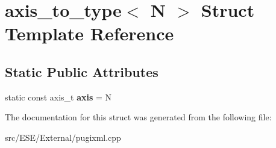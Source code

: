 \hypertarget{structaxis__to__type}{\section{axis\-\_\-to\-\_\-type$<$ N $>$ Struct Template Reference}
\label{structaxis__to__type}
}
\subsection*{Static Public Attributes}
\begin{DoxyCompactItemize}
\item 
\hypertarget{structaxis__to__type_ac9d75681918ad98c980db0f49b570b50}{static const axis\-\_\-t {\bfseries axis} = N}\label{structaxis__to__type_ac9d75681918ad98c980db0f49b570b50}

\end{DoxyCompactItemize}


The documentation for this struct was generated from the following file\-:\begin{DoxyCompactItemize}
\item 
src/\-E\-S\-E/\-External/pugixml.\-cpp\end{DoxyCompactItemize}

